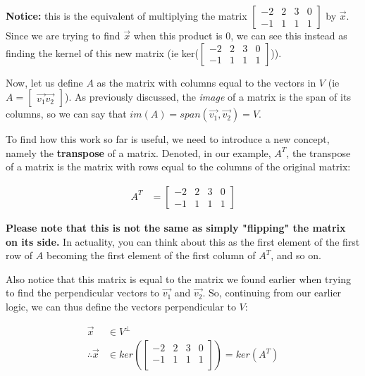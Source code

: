 \documentclass[12pt]{article}
\begin{document}
{\textbf{Notice:} this is the equivalent of multiplying the matrix $\begin{bmatrix}
    -2 & 2 & 3 & 0\\
    -1 & 1 & 1 & 1
\end{bmatrix}$ by $\vec{x}$. Since we are trying to find $\vec{x}$ when this product is $0$, we can see this instead as finding the kernel of this new matrix (ie ker($\begin{bmatrix}
    -2 & 2 & 3 & 0\\
    -1 & 1 & 1 & 1\end{bmatrix}$)).

Now, let us define $A$ as the matrix with columns equal to the vectors in $V$ (ie $A = \begin{bmatrix}\vec{v_1} \vec{v_2}\end{bmatrix}$). As previously discussed, the \textit{image} of a matrix is the span of its columns, so we can say that $im(A) = span(\vec{v_1}, \vec{v_2}) = V$.

To find how this work so far is useful, we need to introduce a new concept, namely the \textbf{transpose} of a matrix. Denoted, in our example, $A^T$, the transpose of a matrix is the matrix with rows equal to the columns of the original matrix:

\begin{equation}
    \begin{split}
        A^T &= \begin{bmatrix}
            -2&2&3&0\\
            -1&1&1&1
        \end{bmatrix}
    \end{split}
\end{equation}
    
\textbf{Please note that this is not the same as simply "flipping" the matrix on its side.} In actuality, you can think about this as the first element of the first row of $A$ becoming the first element of the first column of $A^T$, and so on.

Also notice that this matrix is equal to the matrix we found earlier when trying to find the perpendicular vectors to $\vec{v_1}$ and $\vec{v_2}$. So, continuing from our earlier logic, we can thus define the vectors perpendicular to $V$:

\begin{equation}
    \begin{split}
        \vec{x} &\in V^\bot\\
        \therefore \vec{x} &\in ker(\begin{bmatrix}
            -2 & 2 & 3 & 0\\
            -1 & 1 & 1 & 1\\
        \end{bmatrix}) = ker(A^T)\\
    \end{split}
\end{equation}

}
\end{document}
